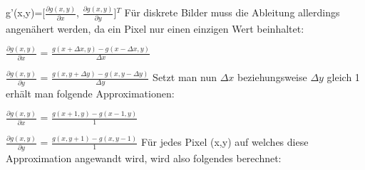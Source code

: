 \documentclass[11pt, a4paper]{article}
\begin{document}
g'(x,y)=[$\frac{\partial g(x,y)}{\partial x}$, $\frac{\partial g(x,y)}{\partial y}$]$^T$
\newline
Für diskrete Bilder muss die Ableitung allerdings angenähert werden, da ein Pixel nur einen einzigen Wert beinhaltet:
\newline

$\frac{\partial g(x,y)}{\partial x}$ = $\frac{g(x+\Delta x,y)-g(x-\Delta x,y)}{\Delta x}$
\newline

$\frac{\partial g(x,y)}{\partial y}$ = $\frac{g(x,y+\Delta y)-g(x,y-\Delta y)}{\Delta y}$
\newline
Setzt man nun $\Delta x$ beziehungsweise $\Delta y$ gleich 1 erhält man folgende Approximationen:
\newline

$\frac{\partial g(x,y)}{\partial x}$ = $\frac{g(x+1,y)-g(x-1,y)}{1}$
\newline

$\frac{\partial g(x,y)}{\partial y}$ = $\frac{g(x,y+1)-g(x,y-1)}{1}$
\newline
Für jedes Pixel (x,y) auf welches diese Approximation angewandt wird, wird also folgendes berechnet:
\newline
\end{document}
